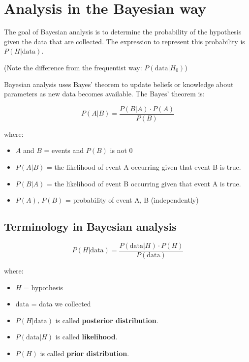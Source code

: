 \documentclass[
]{book}
\providecommand{\tightlist}{%
  \setlength{\itemsep}{0pt}\setlength{\parskip}{0pt}}
\begin{document}
\section{Analysis in the Bayesian way}\label{analysis-in-the-bayesian-way}

The goal of Bayesian analysis is to determine the probability of the hypothesis given the data that are collected. The expression to represent this probability is \(P(H|\text{data})\).

(Note the difference from the frequentist way: \(P(\text{data}|H_0)\))

Bayesian analysis uses Bayes' theorem to update beliefs or knowledge about parameters as new data becomes available. The Bayes' theorem is:

\[P(A|B) = \frac{P(B|A) \cdot P(A)}{P(B)}\]

where:

\begin{itemize}
\tightlist
\item
  \(A\) and \(B\) = events and \(P(B)\) is not 0
\item
  \(P(A|B)\) = the likelihood of event A occurring given that event B is true.
\item
  \(P(B|A)\) = the likelihood of event B occurring given that event A is true.
\item
  \(P(A)\), \(P(B)\) = probability of event A, B (independently)
\end{itemize}

\subsection{Terminology in Bayesian analysis}\label{terminology-in-bayesian-analysis}

\[P(H|\text{data}) = \frac{P(\text{data}|H) \cdot P(H)}{P(\text{data})}\]

where:

\begin{itemize}
\tightlist
\item
  \(H\) = hypothesis
\item
  data = data we collected
\item
  \(P(H|\text{data})\) is called \textbf{posterior distribution}.
\item
  \(P(\text{data}|H)\) is called \textbf{likelihood}.
\item
  \(P(H)\) is called \textbf{prior distribution}.
\end{itemize}
\end{document}
